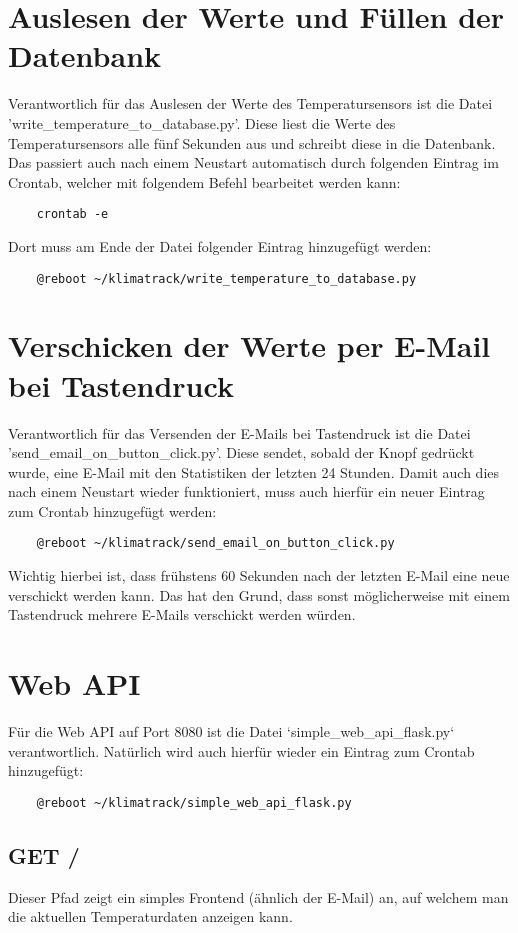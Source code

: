 \documentclass{article}
\begin{document}
\section{Auslesen der Werte und Füllen der Datenbank}
Verantwortlich für das Auslesen der Werte des Temperatursensors ist die Datei 'write\_temperature\_to\_database.py'. Diese liest die Werte des Temperatursensors alle fünf Sekunden aus und schreibt diese in die Datenbank.
Das passiert auch nach einem Neustart automatisch durch folgenden Eintrag im Crontab, welcher mit folgendem Befehl bearbeitet werden kann:
\begin{verbatim}
    crontab -e
\end{verbatim}
Dort muss am Ende der Datei folgender Eintrag hinzugefügt werden:
\begin{verbatim}
    @reboot ~/klimatrack/write_temperature_to_database.py
\end{verbatim}
\section{Verschicken der Werte per E-Mail bei Tastendruck}
Verantwortlich für das Versenden der E-Mails bei Tastendruck ist die Datei 'send\_email\_on\_button\_click.py'. Diese sendet, sobald der Knopf gedrückt wurde, eine E-Mail mit den Statistiken der letzten 24 Stunden.
Damit auch dies nach einem Neustart wieder funktioniert, muss auch hierfür ein neuer Eintrag zum Crontab hinzugefügt werden:
\begin{verbatim}
    @reboot ~/klimatrack/send_email_on_button_click.py
\end{verbatim}
Wichtig hierbei ist, dass frühstens 60 Sekunden nach der letzten E-Mail eine neue verschickt werden kann. Das hat den Grund, dass sonst möglicherweise mit einem Tastendruck mehrere E-Mails verschickt werden würden.
\section{Web API}
Für die Web API auf Port 8080 ist die Datei `simple\_web\_api\_flask.py` verantwortlich. Natürlich wird auch hierfür wieder ein Eintrag zum Crontab hinzugefügt:
\begin{verbatim}
    @reboot ~/klimatrack/simple_web_api_flask.py
\end{verbatim}
\subsection{GET /}
Dieser Pfad zeigt ein simples Frontend (ähnlich der E-Mail) an, auf welchem man die aktuellen Temperaturdaten anzeigen kann.
\end{document}

